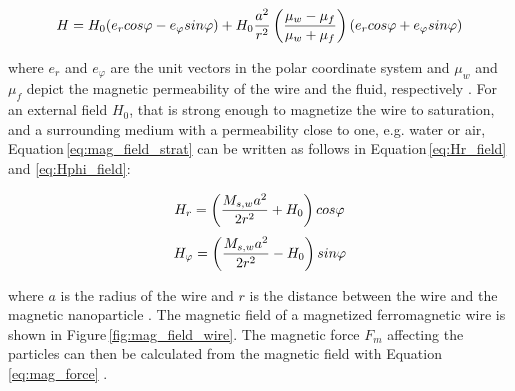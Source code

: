 \begin{equation}
\label{eq:mag_field_strat}
\centering
H = H_{0}(e_{r}cos\varphi-e_{\varphi}sin\varphi)+H_{0}\frac{a^{2}}{r^{2}}\left(\frac{\mu_{w}-\mu_{f}}{\mu_{w}+\mu_{f}}\right)(e_{r}cos\varphi+e_{\varphi}sin\varphi)
\end{equation}

where $e_{r}$ and $e_{\varphi}$ are the unit vectors in the polar coordinate system and $\mu_{w}$ and $\mu_{f}$ depict the magnetic permeability of the wire and the fluid, respectively \cite{stratton2007electromagnetic}. For an external field $H_{0}$, that is strong enough to magnetize the wire to saturation, and a surrounding medium with a permeability close to one, e.g. water or air, Equation\,\ref{eq:mag_field_strat} can be written as follows in Equation\,\ref{eq:Hr_field} and \ref{eq:Hphi_field}:

\begin{equation}
\label{eq:Hr_field}
\centering
H_{r} = \left(\frac{M_{s,w}a^{2}}{2r^{2}}+H_{0}\right)cos\varphi
\end{equation}
\begin{equation}
\label{eq:Hphi_field}
\centering
H_{\varphi} = \left(\frac{M_{s,w}a^{2}}{2r^{2}}-H_{0}\right)sin\varphi
\end{equation}

where $a$ is the radius of the wire and $r$ is the distance between the wire and the magnetic nanoparticle \cite{FranzrebHabil}. The magnetic field of a magnetized ferromagnetic wire is shown in Figure\,\ref{fig:mag_field_wire}. The magnetic force $F_{m}$ affecting the particles can then be calculated from the magnetic field with Equation\,\ref{eq:mag_force} \cite{moeser2004high}. 

